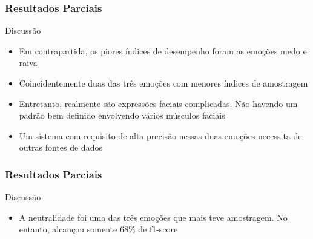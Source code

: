 \documentclass{beamer}
\begin{document}
\begin{frame}
\frametitle{Resultados Parciais}
 \begin{block}{Discussão}
\begin{itemize}
\item Em contrapartida, os piores índices de desempenho foram as emoções medo e raiva
\item Coincidentemente duas das três emoções com menores índices de amostragem
\pause
\item Entretanto, realmente são expressões faciais complicadas. Não havendo um padrão bem definido envolvendo vários músculos faciais
\pause
\item Um sistema com requisito de alta precisão nessas duas emoções necessita de outras fontes de dados
\end{itemize}
\end{block}
\end{frame}


\begin{frame}
\frametitle{Resultados Parciais}
 \begin{block}{Discussão}
\begin{itemize}
\pause
\item A neutralidade foi uma das três emoções que mais teve amostragem. No entanto, alcançou somente 68\% de f1-score
\end{itemize}
\end{block}
\end{frame}
\end{document}
